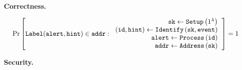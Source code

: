 \textbf{Correctness.}

\[
  \textrm{Pr}\left[ 
    \mathtt{Label}(\mathtt{alert, hint}) \in \mathtt{addr} : 
    \begin{tabular}{r}
      $\mathtt{sk} \gets \mathtt{Setup}\left(1^\lambda\right)$\\
      $(\mathtt{id, hint}) \gets \mathtt{Identify}\left(\mathtt{sk, event}\right)$\\
      $\mathtt{alert} \gets \mathtt{Process}\left(\mathtt{id}\right)$\\
      $\mathtt{addr} \gets \mathtt{Address}\left(\mathtt{sk}\right)$\\
    \end{tabular} 
  \right] = 1
\]

\textbf{Security.}



